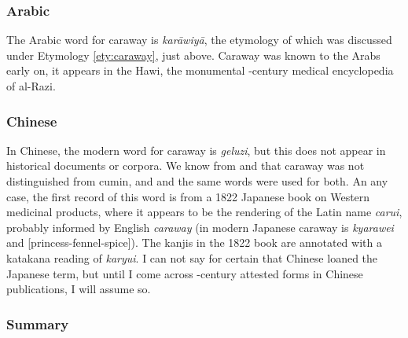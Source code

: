 

\subsubsection{Arabic}

% 

The Arabic word for caraway is  \textit{karāwiyā}, the etymology of which was discussed under Etymology \ref{ety:caraway}, just above. Caraway was known to the Arabs early on, it appears in the \gls{Hawi}, the monumental -century medical encyclopedia of al-Razi.



\subsubsection{Chinese}



In Chinese, the modern word for caraway is  \textit{geluzi}, but this does not appear in historical documents or corpora. We know from \textcite{laufer_sino-iranica_1919} and \textcite{schafer_golden_1985} that caraway was not distinguished from cumin, and and the same words were used for both. An any case, the first record of this word is from a 1822 Japanese book on Western medicinal products, where it appears to be the rendering of the Latin name \textit{carui}, probably informed by English \textit{caraway} (in modern Japanese caraway is  \textit{kyarawei} and  [princess-fennel-spice]). The kanjis in the 1822 book are annotated with a katakana reading of  \textit{karyui}. I can not say for certain that Chinese loaned the Japanese term, but until I come across -century attested forms in Chinese publications, I will assume so.



\subsubsection{Summary}



